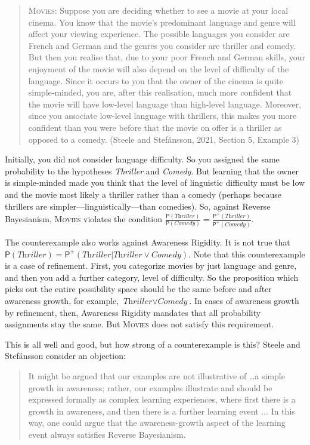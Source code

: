 \documentclass[
  11pt,
  dvipsnames,enabledeprecatedfontcommands]{scrartcl}
\newcommand{\pr}[1]{\ensuremath{\mathsf{P}(#1)}}
\newcommand{\ppr}[2]{\ensuremath{\mathsf{P}^{#1}(#2)}}
\begin{document}
\begin{quote}
\textsc{Movies}: Suppose you are deciding whether to see a movie at your
local cinema. You know that the movie's predominant language and genre
will affect your viewing experience. The possible languages you consider
are French and German and the genres you consider are thriller and
comedy. But then you realise that, due to your poor French and German
skills, your enjoyment of the movie will also depend on the level of
difficulty of the language. Since it occurs to you that the owner of the
cinema is quite simple-minded, you are, after this realisation, much
more confident that the movie will have low-level language than
high-level language. Moreover, since you associate low-level language
with thrillers, this makes you more confident than you were before that
the movie on offer is a thriller as opposed to a comedy. (Steele and
Stefánsson, 2021, Section 5, Example 3)
\end{quote}

\noindent Initially, you did not consider language difficulty. So you
assigned the same probability to the hypotheses \textit{Thriller} and
\textit{Comedy}. But learning that the owner is simple-minded made you
think that the level of linguistic difficulty must be low and the movie
most likely a thriller rather than a comedy (perhaps because thrillers
are simpler---linguistically---than comedies). So, against Reverse
Bayesianism, \textsc{Movies} violates the condition
\(\frac{\pr{\textit{Thriller}}}{\pr{\textit{Comedy}}}=\frac{\ppr{+}{\textit{Thriller}}}{\ppr{+}{\textit{Comedy}}}\).

The counterexample also works against Awareness Rigidity. It is not true
that
\(\pr{\textit{Thriller}}=\ppr{+}{\textit{Thriller} \vert \textit{Thriller}\vee \textit{Comedy}}\).
Note that this counterexample is a case of refinement. First, you
categorize movies by just language and genre, and then you add a further
category, level of difficulty. So the proposition which picks out the
entire possibility space should be the same before and after awareness
growth, for example, \(\textit{Thriller}\vee \textit{Comedy}\). In cases
of awareness growth by refinement, then, Awareness Rigidity mandates
that all probability assignments stay the same. But \textsc{Movies} does
not satisfy this requirement.

This is all well and good, but how strong of a counterexample is this?
Steele and Stefánsson consider an objection:

\begin{quote}It might be argued that our examples are not illustrative of \dots a simple growth in awareness; rather, our examples illustrate and should be expressed 
  formally as complex learning experiences, where first there is a growth in awareness, and then 
  there is a further learning event ... In this way, one could argue that the awareness-growth 
  aspect of the learning event always satisfies Reverse Bayesianism.
\end{quote}
\end{document}
